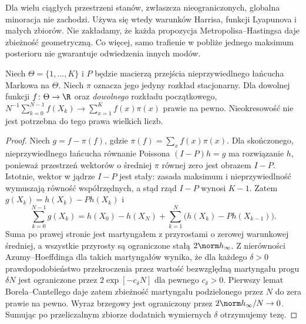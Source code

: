 \begin{uwaga}
Dla wielu ciągłych przestrzeni stanów, zwłaszcza
nieograniczonych, globalna minoracja nie zachodzi.
Używa się wtedy warunków Harrisa, funkcji Lyapunova
i małych zbiorów. Nie zakładamy, że każda propozycja
Metropolisa--Hastingsa daje zbieżność geometryczną.
Co więcej, samo trafienie w pobliże jednego maksimum
posterioru nie gwarantuje odwiedzenia innych modów.
\end{uwaga}

\begin{twierdzenie}
\label{thm:mcmc-finite-slln}
Niech $\Theta=\{1,\ldots,K\}$ i $P$ będzie macierzą
przejścia nieprzywiedlnego łańcucha Markowa na $\Theta$.
Niech $\pi$ oznacza jego jedyny rozkład stacjonarny.
Dla dowolnej funkcji $f\colon\Theta\to\R$ oraz
\emph{dowolnego} rozkładu początkowego,
$N^{-1}\sum_{k=0}^{N-1}f(X_k)\to\sum_{x=1}^Kf(x)\pi(x)$
prawie na pewno. Nieokresowość nie jest potrzebna
do tego prawa wielkich liczb.
\end{twierdzenie}
\begin{proof}
Niech $g=f-\pi(f)$, gdzie
$\pi(f)=\sum_xf(x)\pi(x)$. Dla skończonego,
nieprzywiedlnego łańcucha równanie Poissona
$(I-P)h=g$ ma rozwiązanie $h$, ponieważ przestrzeń
wektorów o średniej $\pi$ równej zero jest obrazem
$I-P$. Istotnie, wektor w jądrze $I-P$ jest stały:
zasada maksimum i nieprzywiedlność wymuszają
równość współrzędnych, a stąd rząd $I-P$ wynosi $K-1$.
Zatem $g(X_k)=h(X_k)-Ph(X_k)$ i
\[
 \sum_{k=0}^{N-1}g(X_k)
 =h(X_0)-h(X_N)+\sum_{k=1}^{N}
   \big(h(X_k)-Ph(X_{k-1})\big).
\]
Suma po prawej stronie jest martyngałem z przyrostami
o zerowej warunkowej średniej, a wszystkie przyrosty
są ograniczone stałą $2\norm h_\infty$.
Z nierówności Azumy--Hoeffdinga dla takich martyngałów
wynika, że dla każdego $\delta>0$ prawdopodobieństwo
przekroczenia przez wartość bezwzględną martyngału
progu $\delta N$ jest ograniczone przez
$2\exp[-c_\delta N]$ dla pewnego $c_\delta>0$.
Pierwszy lemat Borela--Cantellego daje zatem
zbieżność martyngału podzielonego przez $N$ do zera
prawie na pewno. Wyraz brzegowy jest ograniczony
przez $2\norm h_\infty/N\to0$. Sumując po
przeliczalnym zbiorze dodatnich wymiernych $\delta$
otrzymujemy tezę.
\end{proof}

